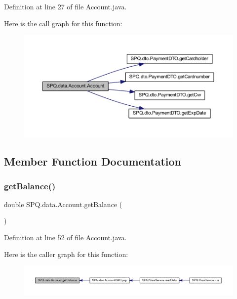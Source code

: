 Definition at line 27 of file Account.\+java.

Here is the call graph for this function\+:\nopagebreak
\begin{figure}[H]
\begin{center}
\leavevmode
\includegraphics[width=350pt]{class_s_p_q_1_1data_1_1_account_a0d4661bfe533c8e38fc996747f3a4952_cgraph}
\end{center}
\end{figure}


\subsection{Member Function Documentation}
\mbox{\label{class_s_p_q_1_1data_1_1_account_a39cb32b817edf85d7cf23d9b39bb0dc5}} 
\subsubsection{\texorpdfstring{get\+Balance()}{getBalance()}}
{\footnotesize\ttfamily double S\+P\+Q.\+data.\+Account.\+get\+Balance (\begin{DoxyParamCaption}{ }\end{DoxyParamCaption})}



Definition at line 52 of file Account.\+java.

Here is the caller graph for this function\+:\nopagebreak
\begin{figure}[H]
\begin{center}
\leavevmode
\includegraphics[width=350pt]{class_s_p_q_1_1data_1_1_account_a39cb32b817edf85d7cf23d9b39bb0dc5_icgraph}
\end{center}
\end{figure}
\mbox{\label{class_s_p_q_1_1data_1_1_account_ab4297cf24cbff2975364306a31e75db9}} 
